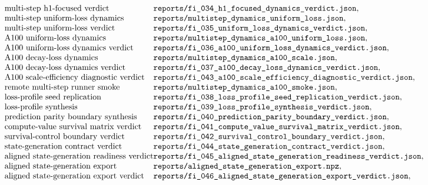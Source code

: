 $$\begin{array}{@{}l@{}l@{}}
\text{multi-step h1-focused verdict} & \texttt{reports/fi\_034\_h1\_focused\_dynamics\_verdict.json},\\
\text{multi-step uniform-loss dynamics} & \texttt{reports/multistep\_dynamics\_uniform\_loss.json},\\
\text{multi-step uniform-loss verdict} & \texttt{reports/fi\_035\_uniform\_loss\_dynamics\_verdict.json},\\
\text{A100 uniform-loss dynamics} & \texttt{reports/multistep\_dynamics\_a100\_uniform\_loss.json},\\
\text{A100 uniform-loss dynamics verdict} & \texttt{reports/fi\_036\_a100\_uniform\_loss\_dynamics\_verdict.json},\\
\text{A100 decay-loss dynamics} & \texttt{reports/multistep\_dynamics\_a100\_scale.json},\\
\text{A100 decay-loss dynamics verdict} & \texttt{reports/fi\_037\_a100\_decay\_loss\_dynamics\_verdict.json},\\
\text{A100 scale-efficiency diagnostic verdict} & \texttt{reports/fi\_043\_a100\_scale\_efficiency\_diagnostic\_verdict.json},\\
\text{remote multi-step runner smoke} & \texttt{reports/multistep\_dynamics\_a100\_smoke.json},\\
\text{loss-profile seed replication} & \texttt{reports/fi\_038\_loss\_profile\_seed\_replication\_verdict.json},\\
\text{loss-profile synthesis} & \texttt{reports/fi\_039\_loss\_profile\_synthesis\_verdict.json},\\
\text{prediction parity boundary synthesis} & \texttt{reports/fi\_040\_prediction\_parity\_boundary\_verdict.json},\\
\text{compute-value survival matrix verdict} & \texttt{reports/fi\_041\_compute\_value\_survival\_matrix\_verdict.json},\\
\text{survival-control boundary verdict} & \texttt{reports/fi\_042\_survival\_control\_boundary\_verdict.json},\\
\text{state-generation contract verdict} & \texttt{reports/fi\_044\_state\_generation\_contract\_verdict.json},\\
\text{aligned state-generation readiness verdict} & \texttt{reports/fi\_045\_aligned\_state\_generation\_readiness\_verdict.json},\\
\text{aligned state-generation export} & \texttt{reports/aligned\_state\_generation\_export.npz},\\
\text{aligned state-generation export verdict} & \texttt{reports/fi\_046\_aligned\_state\_generation\_export\_verdict.json},\\

\end{array}$$
